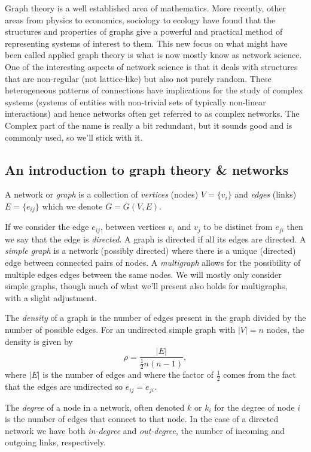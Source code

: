 \documentclass{article}
\begin{document}
Graph theory is a well established area of mathematics. More recently, other areas from physics to economics, sociology to ecology have found that the structures and properties of graphs give a powerful and practical method of representing systems of interest to them. This new focus on what might have been called applied graph theory is what is now mostly know as network science. One of the interesting aspects of network science is that it deals with structures that are non-regular (not lattice-like) but also not purely random. These heterogeneous patterns of connections have implications for the study of complex systems (systems of entities with non-trivial sets of typically non-linear interactions) and hence networks often get referred to as complex networks. The Complex part of the name is really a bit redundant, but it sounds good and is commonly used, so we'll stick with it.

\subsection*{An introduction to graph theory \& networks}

A network or \emph{graph} is a collection of \emph{vertices} (nodes) $V=\{v_i\}$ and \emph{edges} (links) $E=\{e_{ij}\}$ which we denote $G= G(V,E)$.

If we consider the edge $e_{ij}$, between vertices $v_i$ and $v_j$ to be distinct from $e_{ji}$ then we say that the edge is \emph{directed}. A graph is directed if all its edges are directed. A \emph{simple graph} is a network (possibly directed) where there is a unique (directed) edge between connected pairs of nodes. A \emph{multigraph} allows for the possibility of multiple edges edges between the same nodes. We will mostly only consider simple graphs, though much of what we'll present also holds for multigraphs, with a slight adjustment. 

The \emph{density} of a graph is the number of edges present in the graph divided by the number of possible edges. For an undirected simple graph with $|V|=n$ nodes, the density is given by
$$
	\rho = \frac{|E|}{\frac12 n(n-1)},
$$
where $|E|$ is the number of edges and where the factor of $\frac12$ comes from the fact that the edges are undirected so $e_{ij}=e_{ji}$. 

The \emph{degree} of a node in a network, often denoted $k$ or $k_i$ for the degree of node $i$ is the number of edges that connect to that node. In the case of a directed network we have both \emph{in-degree} and \emph{out-degree}, the number of incoming and outgoing links, respectively.
\end{document}
